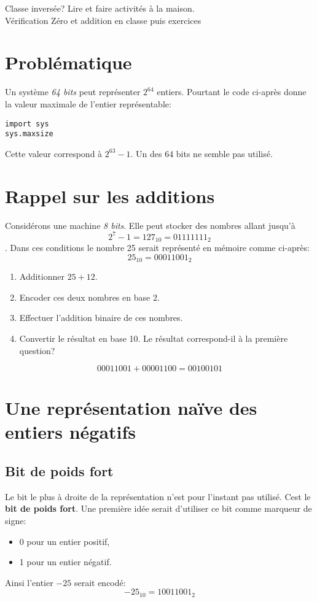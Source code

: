 \documentclass[a4paper,11pt]{article}
\begin{document}
\begin{Form}
\begin{commentprof}
Classe inversée? Lire et faire activités à la maison. \\
Vérification Zéro et addition en classe puis exercices
\end{commentprof}
\section{Problématique}
Un système \emph{64 bits} peut représenter $2^{64}$ entiers. Pourtant le code ci-après donne la valeur maximale de l'entier représentable:
\begin{lstlisting}
import sys
sys.maxsize
\end{lstlisting}
Cette valeur correspond à $2^{63}-1$. Un des 64 bits ne semble pas utilisé.
\begin{center}
\end{center}
\section{Rappel sur les additions}
Considérons une machine \emph{8 bits}. Elle peut stocker des nombres allant jusqu'à $$2^7-1 = 127_{10} = 01111111_2$$. Dans ces conditions le nombre 25 serait représenté en mémoire comme ci-après:
$$25_{10} = 00011001_2$$
\begin{activite}
\begin{enumerate}
\item Additionner $25+12$.
\item Encoder ces deux nombres en base 2.
\item Effectuer l'addition binaire de ces nombres.
\item Convertir le résultat en base 10. Le résultat correspond-il à la première question?
\end{enumerate}
\end{activite}
\begin{commentprof}
$$00011001 + 00001100 = 00100101$$
\end{commentprof}
\section{Une représentation naïve des entiers négatifs}
\subsection{Bit de poids fort}
Le bit le plus à droite de la représentation n'est pour l'instant pas utilisé. Cest le \textbf{bit de poids fort}. Une première idée serait d'utiliser ce bit comme marqueur de signe:
\begin{itemize}
\item 0 pour un entier positif,
\item 1 pour un entier négatif.
\end{itemize}
Ainsi l'entier $-25$ serait encodé:
$$-25_{10} = 10011001_2$$

\end{Form}
\end{document}
